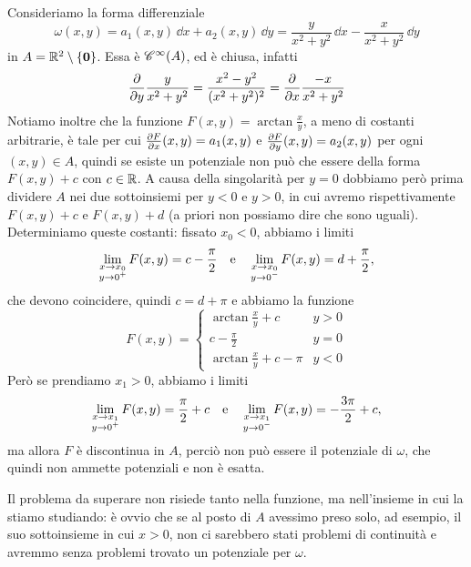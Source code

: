 \begin{esempio} \label{es:forma-differenziale-angolo-R2}
	Consideriamo la forma differenziale
	\begin{equation*}
		\omega(x,y)=a_1(x,y)\,\dd x+a_2(x,y)\,\dd y=\frac{y}{x^2+y^2}\,\dd x-\frac{x}{x^2+y^2}\,\dd y
	\end{equation*}
	in $A=\R^2\setminus\{\vec 0\}$.
	Essa è $\cont[\infty]{A}$, ed è chiusa, infatti
	\begin{equation}
		\drp{}{y}\frac{y}{x^2+y^2}=\frac{x^2-y^2}{(x^2+y^2)^2}=\drp{}{x}\frac{-x}{x^2+y^2}
	\end{equation}
	Notiamo inoltre che la funzione $F(x,y)=\arctan\frac{x}{y}$, a meno di costanti arbitrarie, è tale per cui $\drp{F}{x}(x,y)=a_1(x,y)$ e $\drp{F}{y}(x,y)=a_2(x,y)$ per ogni $(x,y)\in A$, quindi se esiste un potenziale non può che essere della forma $F(x,y)+c$ con $c\in\R$.
	A causa della singolarità per $y=0$ dobbiamo però prima dividere $A$ nei due sottoinsiemi per $y<0$ e $y>0$, in cui avremo rispettivamente $F(x,y)+c$ e $F(x,y)+d$ (a priori non possiamo dire che sono uguali).
	Determiniamo queste costanti: fissato $x_0<0$, abbiamo i limiti
	\begin{equation}
		\lim_{\substack{x\to x_0\\ y\to 0^+}}F(x,y)=c-\frac{\pi}2\qtext{e}\lim_{\substack{x\to x_0\\ y\to 0^-}}F(x,y)=d+\frac{\pi}2,
	\end{equation}
	che devono coincidere, quindi $c=d+\pi$ e abbiamo la funzione
	\begin{equation}
		F(x,y)=
		\begin{cases}
			\arctan\frac{x}{y}+c	&y>0\\
			c-\frac{\pi}2			&y=0\\
			\arctan\frac{x}{y}+c-\pi	&y<0
		\end{cases}
	\end{equation}
	Però se prendiamo $x_1>0$, abbiamo i limiti
	\begin{equation}
		\lim_{\substack{x\to x_1\\ y\to 0^+}}F(x,y)=\frac{\pi}2+c\qtext{e}\lim_{\substack{x\to x_1\\ y\to 0^-}}F(x,y)=-\frac{3\pi}2+c,
	\end{equation}
	ma allora $F$ è discontinua in $A$, perciò non può essere il potenziale di $\omega$, che quindi non ammette potenziali e non è esatta.
\end{esempio}
Il problema da superare non risiede tanto nella funzione, ma nell'insieme in cui la stiamo studiando: è ovvio che se al posto di $A$ avessimo preso solo, ad esempio, il suo sottoinsieme in cui $x>0$, non ci sarebbero stati problemi di continuità e avremmo senza problemi trovato un potenziale per $\omega$.
